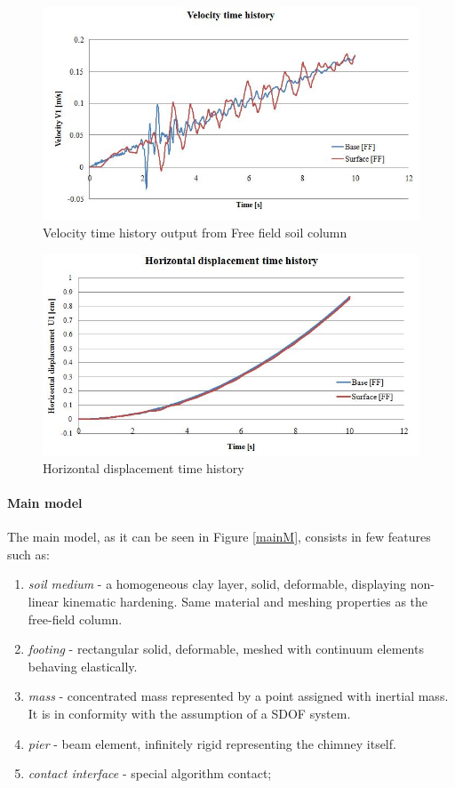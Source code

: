 		\begin{figure}[h!]
				\centering
				\includegraphics[width=0.7\linewidth]{"velocity_FF"}
				\caption{Velocity time history output from Free field soil column}
				\label{velo}
			\end{figure} 
			
		\begin{figure}[!h]
					\centering
					\includegraphics[width=0.7\linewidth]{"DIsp_ff"}
					\caption{Horizontal displacement time history}
					\label{disp_ff}
				\end{figure} 
				
	\newpage
	\paragraph{Main model}
	The main model, as it can be seen in Figure \ref{mainM}, consists in few features such as:
	\begin{enumerate}
		\item \textit{soil medium} - a homogeneous clay layer, solid, deformable, displaying non-linear kinematic hardening. Same material and meshing properties as the free-field column.
		\item \textit{footing} -  rectangular solid, deformable, meshed with continuum elements behaving elastically.
		\item \textit{mass} - concentrated mass represented by a point assigned with inertial mass. It is in conformity with the assumption of a SDOF system.
		\item \textit{pier} - beam element, infinitely rigid representing the chimney itself.
		\item \textit{contact interface} - special algorithm contact;
	\end{enumerate}
	
